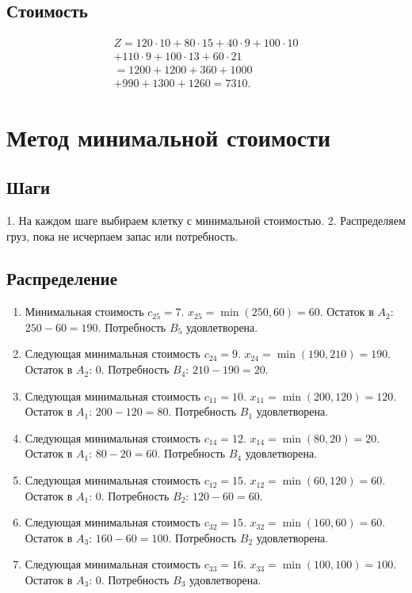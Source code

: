 \documentclass{article}
\begin{document}
\subsection{Стоимость}
\begin{multline}
Z = 120 \cdot 10 + 80 \cdot 15 + 40 \cdot 9 + 100 \cdot 10 \\
+ 110 \cdot 9 + 100 \cdot 13 + 60 \cdot 21 \\
= 1200 + 1200 + 360 + 1000 \\
+ 990 + 1300 + 1260 = 7310.
\end{multline}

\section{Метод минимальной стоимости}

\subsection{Шаги}
1. На каждом шаге выбираем клетку с минимальной стоимостью.  
2. Распределяем груз, пока не исчерпаем запас или потребность.

\subsection{Распределение}
\begin{enumerate}
\item Минимальная стоимость \( c_{25} = 7 \).  
\( x_{25} = \min(250, 60) = 60 \).  
Остаток в \( A_2 \): \( 250 - 60 = 190 \).  
Потребность \( B_5 \) удовлетворена.

\item Следующая минимальная стоимость \( c_{24} = 9 \).  
\( x_{24} = \min(190, 210) = 190 \).  
Остаток в \( A_2 \): 0.  
Потребность \( B_4 \): \( 210 - 190 = 20 \).

\item Следующая минимальная стоимость \( c_{11} = 10 \).  
\( x_{11} = \min(200, 120) = 120 \).  
Остаток в \( A_1 \): \( 200 - 120 = 80 \).  
Потребность \( B_1 \) удовлетворена.

\item Следующая минимальная стоимость \( c_{14} = 12 \).  
\( x_{14} = \min(80, 20) = 20 \).  
Остаток в \( A_1 \): \( 80 - 20 = 60 \).  
Потребность \( B_4 \) удовлетворена.

\item Следующая минимальная стоимость \( c_{12} = 15 \).  
\( x_{12} = \min(60, 120) = 60 \).  
Остаток в \( A_1 \): 0.  
Потребность \( B_2 \): \( 120 - 60 = 60 \).

\item Следующая минимальная стоимость \( c_{32} = 15 \).  
\( x_{32} = \min(160, 60) = 60 \).  
Остаток в \( A_3 \): \( 160 - 60 = 100 \).  
Потребность \( B_2 \) удовлетворена.

\item Следующая минимальная стоимость \( c_{33} = 16 \).  
\( x_{33} = \min(100, 100) = 100 \).  
Остаток в \( A_3 \): 0.  
Потребность \( B_3 \) удовлетворена.
\end{enumerate}
\end{document}
